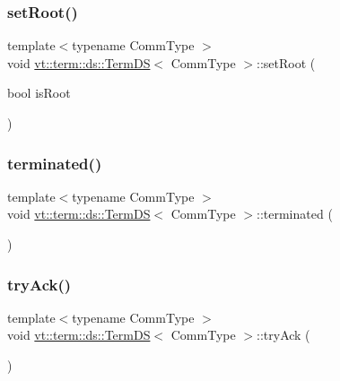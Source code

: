 \subsubsection{\texorpdfstring{set\+Root()}{setRoot()}}
{\footnotesize\ttfamily template$<$typename Comm\+Type $>$ \\
void \hyperlink{structvt_1_1term_1_1ds_1_1_term_d_s}{vt\+::term\+::ds\+::\+Term\+DS}$<$ Comm\+Type $>$\+::set\+Root (\begin{DoxyParamCaption}\item[{bool}]{is\+Root }\end{DoxyParamCaption})}

\mbox{\label{structvt_1_1term_1_1ds_1_1_term_d_s_acf4896eceb679d2ee46f5cc0ff1420e3}} 
\subsubsection{\texorpdfstring{terminated()}{terminated()}}
{\footnotesize\ttfamily template$<$typename Comm\+Type $>$ \\
void \hyperlink{structvt_1_1term_1_1ds_1_1_term_d_s}{vt\+::term\+::ds\+::\+Term\+DS}$<$ Comm\+Type $>$\+::terminated (\begin{DoxyParamCaption}{ }\end{DoxyParamCaption})}

\mbox{\label{structvt_1_1term_1_1ds_1_1_term_d_s_ad5693df663610dc8003d37c5c505b9f4}} 
\subsubsection{\texorpdfstring{try\+Ack()}{tryAck()}}
{\footnotesize\ttfamily template$<$typename Comm\+Type $>$ \\
void \hyperlink{structvt_1_1term_1_1ds_1_1_term_d_s}{vt\+::term\+::ds\+::\+Term\+DS}$<$ Comm\+Type $>$\+::try\+Ack (\begin{DoxyParamCaption}{ }\end{DoxyParamCaption})}



